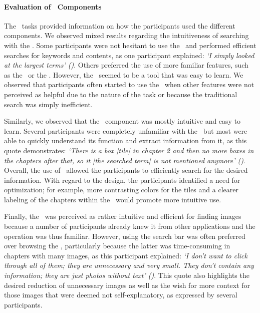 \paragraph*{Evaluation of \apluschis\ Components} 
The \cwt\ tasks provided information on how the participants used the different components. 
%
We observed mixed results regarding the intuitiveness of searching with the \WordCloud. 
%
Some participants were not hesitant to use the \WordCloud\ and performed efficient searches for keywords and contents, as one participant explained: \emph{‘I simply looked at the largest terms’ (\PTwo)}. 
%
Others preferred the use of more familiar features, such as the \TableOfContents\ or the \Searchbar. 
%
However, the \WordCloud\ seemed to be a tool that was easy to learn. We observed that participants often started to use the \WordCloud\ when other features were not perceived as helpful due to the nature of the task or because the traditional search was simply inefficient. 


Similarly, we observed that the \Tilebar\ component was mostly intuitive and easy to learn. Several participants were completely unfamiliar with the \Tilebar\, but most were able to quickly understand its function and extract information from it, as this quote demonstrates: \emph{‘There is a box [tile] in chapter 2 and then no more boxes in the chapters after that, so it [the searched term] is not mentioned anymore’ (\PSix)}. 
%
Overall, the use of \Tilebar\ allowed the participants to efficiently search for the desired information. 
%
With regard to the design, the participants identified a need for optimization; for example, more contrasting colors for the tiles and a clearer labeling of the chapters within the \Tilebar\ would promote more intuitive use.



Finally, the \ImageSlider\ was perceived as rather intuitive and efficient for finding images because a number of participants already knew it from other applications and the operation was thus familiar. 
%
However, using the search bar was often preferred over browsing the \ImageSlider, particularly because the latter was time-consuming in chapters with many images, as this participant explained: \emph{‘I don't want to click through all of them; they are unnecessary and very small. 
%
They don't contain any information; they are just photos without text’ (\PSeven)}. 
%
This quote also highlights the desired reduction of unnecessary images as well as the wish for more context for those images that were deemed not self-explanatory, as expressed by several participants.



